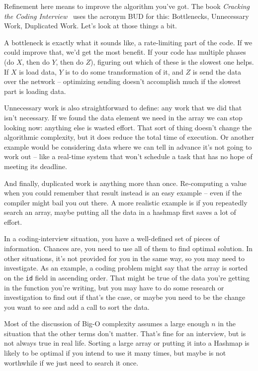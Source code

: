 Refinement here means to improve the algorithm you've got. The book \textit{Cracking the Coding Interview}~\cite{mcdowell2015cracking} uses the acronym BUD for this: Bottlenecks, Unnecessary Work, Duplicated Work. Let's look at those things a bit.

A bottleneck is exactly what it sounds like, a rate-limiting part of the code. If we could improve that, we'd get the most benefit. If your code has multiple phases (do $X$, then do $Y$, then do $Z$), figuring out which of these is the slowest one helps. If $X$ is load data, $Y$ is to do some transformation of it, and $Z$ is send the data over the network -- optimizing sending doesn't accomplish much if the slowest part is loading data. 

Unnecessary work is also straightforward to define: any work that we did that isn't necessary. If we found the data element we need in the array we can stop looking now: anything else is wasted effort. That sort of thing doesn't change the algorithmic complexity, but it does reduce the total time of execution. Or another example would be considering data where we can tell in advance it's not going to work out -- like a real-time system that won't schedule a task that has no hope of meeting its deadline.

And finally, duplicated work is anything more than once. Re-computing a value when you could remember that result instead is an easy example -- even if the compiler might bail you out there. A more realistic example is if you repeatedly search an array, maybe putting all the data in a hashmap first saves a lot of effort. 

In a coding-interview situation, you have a well-defined set of pieces of information. Chances are, you need to use all of them to find optimal solution. In other situations, it's not provided for you in the same way, so you may need to investigate. As an example, a coding problem might say that the array is sorted on the \texttt{id} field in ascending order. That might be true of the data you're getting in the function you're writing, but you may have to do some research or investigation to find out if that's the case, or maybe you need to be the change you want to see and add a call to sort the data.

Most of the discussion of Big-O complexity assumes a large enough $n$ in the situation that the other terms don't matter. That's fine for an interview, but is not always true in real life. Sorting a large array or putting it into a Hashmap is likely to be optimal if you intend to use it many times, but maybe is not worthwhile if we just need to search it once. 

